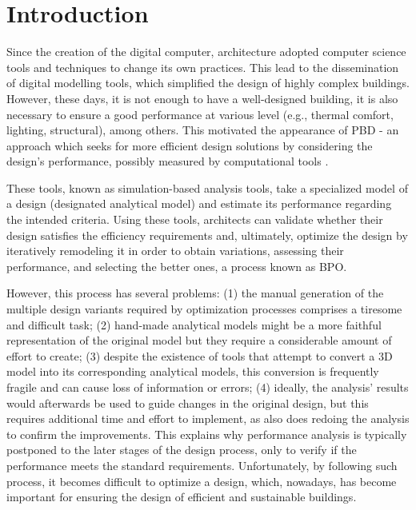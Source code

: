 \section{Introduction}
\label{sec:intro}
	
	Since the creation of the digital computer, architecture adopted computer science tools and techniques to change its own practices. This lead to the dissemination of digital modelling tools, which simplified the design of highly complex buildings. However, these days, it is not enough to have a well-designed building, it is also necessary to ensure a good performance at various level (e.g., thermal comfort, lighting, structural), among others. This motivated the appearance of \ac{PBD} - an approach which seeks for more efficient design solutions by considering the design's performance, possibly measured by computational tools \cite{Oxman2006PBD}. 
	
	These tools, known as simulation-based analysis tools, take a specialized model of a design (designated analytical model) and estimate its performance regarding the intended criteria. Using these tools, architects can validate whether their design satisfies the efficiency requirements and, ultimately, optimize the design by iteratively remodeling it in order to obtain variations, assessing their performance, and selecting the better ones, a process known as \ac{BPO}.
	
	However, this process has several problems: (1) the manual generation of the multiple design variants required by optimization processes comprises a tiresome and difficult task; (2) hand-made analytical models might be a more faithful representation of the original model but they require a considerable amount of effort to create; (3) despite the existence of tools that attempt to convert a 3D model into its corresponding analytical models, this conversion is frequently fragile and can cause loss of information or errors; (4) ideally, the analysis' results would afterwards be used to guide changes in the original design, but this requires additional time and effort to implement, as also does redoing the analysis to confirm the improvements. This explains why performance analysis is typically postponed to the later stages of the design process, only to verify if the performance meets the standard requirements. Unfortunately, by following such process, it becomes difficult to optimize a design, which, nowadays, has become important for ensuring the design of efficient and sustainable buildings.
	

